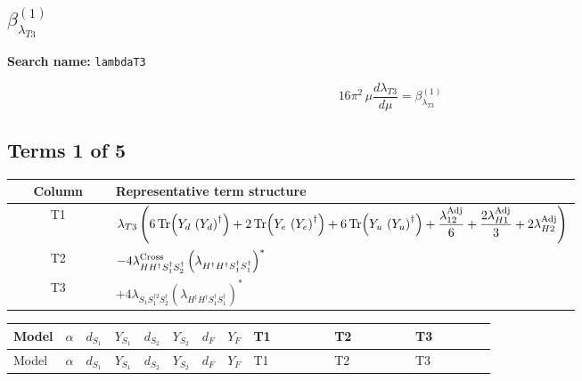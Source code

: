 \documentclass[8pt]{article}
\begin{document}
\begin{landscape}
\section*{$\beta_{\lambda_{T3}}^{(1)}$}
\noindent\textbf{Search name: }\texttt{lambdaT3}\par\smallskip
\[16\pi^2\,\mu\frac{d \lambda_{T3}}{d\mu}=\beta_{\lambda_{T3}}^{(1)}\]
\subsection*{Terms 1 of 5}
\begin{center}
\begin{tabular}{@{}c >{\raggedright\arraybackslash}p{0.82\linewidth}@{}}
\toprule
Column & Representative term structure \\
\midrule
T1 & \(\displaystyle {\lambda_{T3}} \left(6 \operatorname{Tr}\!\left({Y_d}\,\left({Y_d}\right)^{\dagger}\right)+2 \operatorname{Tr}\!\left({Y_e}\,\left({Y_e}\right)^{\dagger}\right)+6 \operatorname{Tr}\!\left({Y_u}\,\left({Y_u}\right)^{\dagger}\right)+\frac{{\lambda_{12}^{\rm Adj}}}{6}+\frac{2 {\lambda_{H1}^{\rm Adj}}}{3}+2 {\lambda_{H2}^{\rm Adj}}\right)\) \\
\midrule
T2 & \(\displaystyle -4 {\lambda_{H H^\dagger S_1^\dagger S_2^\dagger}^{\rm Cross}} \left({\lambda_{H^\dagger H^\dagger S_1^\dagger S_1^\dagger}}\right)^{*}\) \\
\midrule
T3 & \(\displaystyle +4 {\lambda_{S_1 S_1^{\dagger 2}S_2^\dagger}} \left({\lambda_{H^\dagger H^\dagger S_1^\dagger S_1^\dagger}}\right)^{*}\) \\
\midrule
\bottomrule
\end{tabular}
\end{center}
\smallskip
\tiny
\begin{longtable}{@{}llcccccc >{\raggedright\arraybackslash}p{0.21\linewidth} >{\raggedright\arraybackslash}p{0.21\linewidth} >{\raggedright\arraybackslash}p{0.21\linewidth}@{}}
\toprule
Model & $\alpha$ & $d_{S_1}$ & $Y_{S_1}$ & $d_{S_2}$ & $Y_{S_2}$ & $d_F$ & $Y_F$ & T1 & T2 & T3 \\
\midrule
\endfirsthead
\toprule
Model & $\alpha$ & $d_{S_1}$ & $Y_{S_1}$ & $d_{S_2}$ & $Y_{S_2}$ & $d_F$ & $Y_F$ & T1 & T2 & T3 \\
\midrule
\endhead

\end{longtable}
\end{landscape}
\end{document}
